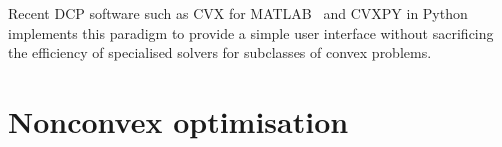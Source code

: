 Recent DCP software such as CVX for MATLAB~\cite{CVX} and CVXPY in Python~\cite{CVXPY} implements this paradigm to provide a simple user interface without sacrificing the efficiency of specialised solvers for subclasses of convex problems.

\section{Nonconvex optimisation}

